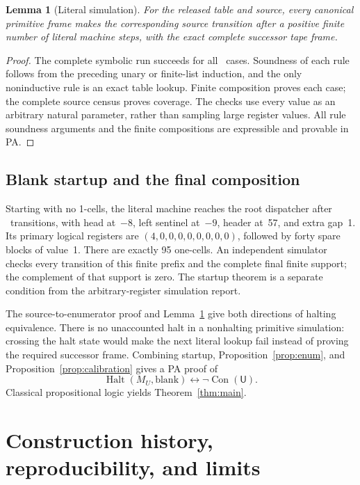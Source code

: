 \documentclass[11pt]{article}
\newcommand{\ThU}{\mathsf U}
\newcommand{\Con}{\operatorname{Con}}
\newcommand{\Halt}{\operatorname{Halt}}
\newtheorem{lemma}[theorem]{Lemma}
\theoremstyle{definition}\newtheorem{definition}[theorem]{Definition}
\begin{document}
\begin{lemma}[Literal simulation]\label{lem:runtime}
For the released table and source, every canonical primitive frame makes
the corresponding source transition after a positive finite number of
literal machine steps, with the exact complete successor tape frame.
\end{lemma}
\begin{proof}
The complete symbolic run succeeds for all \Ncases\ cases. Soundness of
each rule follows from the preceding unary or finite-list induction, and
the only noninductive rule is an exact table lookup. Finite composition
proves each case; the complete source census proves coverage. The checks
use every value as an arbitrary natural parameter, rather than sampling
large register values. All rule soundness arguments and the finite
compositions are expressible and provable in PA.
\end{proof}

\subsection{Blank startup and the final composition}

Starting with no 1-cells, the literal machine reaches the root dispatcher
after \BootSteps\ transitions, with head at~$-8$, left sentinel at~$-9$,
header at~57, and extra gap~1. Its primary logical registers are
$(4,0,0,0,0,0,0,0,0)$, followed by forty spare blocks of value~1. There
are exactly 95 one-cells. An independent simulator checks every transition
of this finite prefix and the complete final finite support; the complement
of that support is zero. The startup theorem is a separate condition from
the arbitrary-register simulation report.

The source-to-enumerator proof and Lemma~\ref{lem:runtime} give both
directions of halting equivalence. There is no unaccounted halt in a
nonhalting primitive simulation: crossing the halt state would make the
next literal lookup fail instead of proving the required successor frame.
Combining startup, Proposition~\ref{prop:enum}, and
Proposition~\ref{prop:calibration} gives a PA proof of
\[
 \Halt(M_U,\mathrm{blank})\longleftrightarrow\neg\Con(\ThU).
\]
Classical propositional logic yields Theorem~\ref{thm:main}.

\section{Construction history, reproducibility, and limits}
\end{document}
